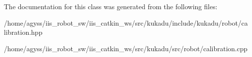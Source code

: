The documentation for this class was generated from the following files\+:\begin{DoxyCompactItemize}
\item 
/home/agyss/iis\+\_\+robot\+\_\+sw/iis\+\_\+catkin\+\_\+ws/src/kukadu/include/kukadu/robot/calibration.\+hpp\item 
/home/agyss/iis\+\_\+robot\+\_\+sw/iis\+\_\+catkin\+\_\+ws/src/kukadu/src/robot/calibration.\+cpp\end{DoxyCompactItemize}
